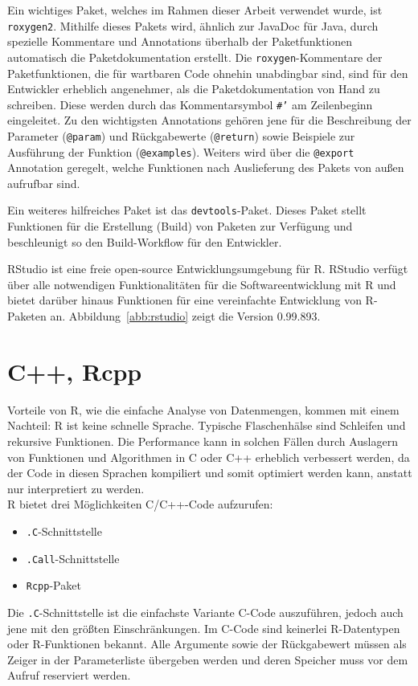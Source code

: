 Ein wichtiges Paket, welches im Rahmen dieser Arbeit verwendet wurde, ist \texttt{roxygen2}. Mithilfe dieses Pakets wird, ähnlich zur JavaDoc für Java, durch spezielle Kommentare und Annotations überhalb der Paketfunktionen automatisch die Paketdokumentation erstellt. Die \texttt{roxygen}-Kommentare der Paketfunktionen, die für wartbaren Code ohnehin unabdingbar sind, sind für den Entwickler erheblich angenehmer, als die Paketdokumentation von Hand zu schreiben. Diese werden durch das Kommentarsymbol \mbox{\texttt{\#'}} am Zeilenbeginn eingeleitet. Zu den wichtigsten Annotations gehören jene für die Beschreibung der Parameter (\texttt{@param}) und Rückgabewerte (\texttt{@return}) sowie Beispiele zur Ausführung der Funktion (\texttt{@examples}). Weiters wird über die \texttt{@export} Annotation geregelt, welche Funktionen nach Auslieferung des Pakets von außen aufrufbar sind.~\cite{roxygen}

Ein weiteres hilfreiches Paket ist das \texttt{devtools}-Paket. Dieses Paket stellt Funktionen für die Erstellung (Build) von Paketen zur Verfügung und beschleunigt so den Build-Workflow für den Entwickler.~\cite{devtools}

RStudio ist eine freie open-source Entwicklungsumgebung für R. RStudio verfügt über alle notwendigen Funktionalitäten für die Softwareentwicklung mit R und bietet darüber hinaus Funktionen für eine vereinfachte Entwicklung von R-Paketen an. Abbildung~\ref{abb:rstudio} zeigt die Version 0.99.893. 
\section{C++, Rcpp}
\label{kapitel:rcpp}
Vorteile von R, wie die einfache Analyse von Datenmengen, kommen mit einem Nachteil: R ist keine schnelle Sprache. Typische Flaschenhälse sind Schleifen und rekursive Funktionen. Die Performance kann in solchen Fällen durch Auslagern von Funktionen und Algorithmen in C oder C++ erheblich verbessert werden, da der Code in diesen Sprachen kompiliert und somit optimiert werden kann, anstatt nur interpretiert zu werden.\\
R bietet drei Möglichkeiten C/C++-Code aufzurufen:
\begin{itemize}
	\itemsep-.2em %
	\item \texttt{.C}-Schnittstelle
	\item \texttt{.Call}-Schnittstelle
	\item \texttt{Rcpp}-Paket
\end{itemize}
Die \texttt{.C}-Schnittstelle ist die einfachste Variante C-Code auszuführen, jedoch auch jene mit den größten Einschränkungen. Im C-Code sind keinerlei R-Datentypen oder R-Funktionen bekannt. Alle Argumente sowie der Rückgabewert müssen als Zeiger in der Parameterliste übergeben werden und deren Speicher muss vor dem Aufruf reserviert werden.

